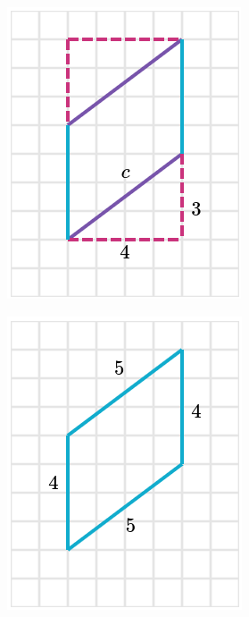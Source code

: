 \begin{solutionbox}{10cm}
\begin{minipage}{0.4\textwidth}
\begin{multicols}{2}
\begin{figure}[H]
                \includegraphics[width=0.9\linewidth]{../images/peri_paralelogramo_01c.png}
                \caption{}
                \label{fig:peri_paralelogramo_01c}
            \end{figure}
            \begin{figure}[H]
                \centering
                \includegraphics[width=0.9\linewidth]{../images/peri_paralelogramo_01d.png}

\end{figure}
\end{multicols}
\end{minipage}
\end{solutionbox}
